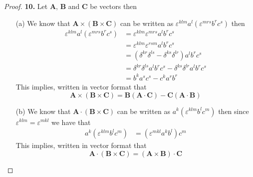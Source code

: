 \documentclass[11pt]{article}
\theoremstyle{definition}
\begin{document}
\cleardoublepage
\begin{proof}{\textbf{10.}}
Let $\bm{A}$, $\bm{B}$ and $\bm{C}$ be vectors then
\begin{itemize}
    \item [(a)] We know that $\bm{A} \times (\bm{B} \times \bm{C})$
    can be written as $\varepsilon^{klm}a^{l}(\varepsilon^{mrs}b^{r}c^{s})$
    then
    \begin{align*}
        \varepsilon^{klm}a^{l}(\varepsilon^{mrs}b^{r}c^{s}) &=
        \varepsilon^{klm}\varepsilon^{mrs}a^{l}b^{r}c^{s}\\
        &= \varepsilon^{klm}\varepsilon^{rsm}a^{l}b^{r}c^{s}\\
        &= (\delta^{kr}\delta^{ls} - \delta^{ks}\delta^{lr})a^{l}b^{r}c^{s}\\
        &= \delta^{kr}\delta^{ls}a^{l}b^{r}c^{s} - \delta^{ks}\delta^{lr}a^{l}b^{r}c^{s}\\
        &= b^{k}a^{s}c^{s} - c^{k}a^{r}b^{r}
    \end{align*}
    This implies, written in vector format that
    $$\bm{A} \times (\bm{B} \times \bm{C})
    = \bm{B}(\bm{A}\cdot \bm{C}) - \bm{C}(\bm{A}\cdot \bm{B})$$
    \item [(b)] We know that $\bm{A} \cdot (\bm{B} \times \bm{C})$
    can be written as $a^k(\varepsilon^{klm}b^{l}c^{m})$
    then since $\varepsilon^{klm} = \varepsilon^{mkl}$ we have that
    \begin{align*}
        a^k(\varepsilon^{klm}b^{l}c^{m}) &=
        (\varepsilon^{mkl}a^kb^{l})c^{m}
    \end{align*}
    This implies, written in vector format that
    $$\bm{A} \cdot (\bm{B} \times \bm{C})
    = (\bm{A} \times \bm{B}) \cdot \bm{C}$$
\end{itemize}
\end{proof}
\cleardoublepage
\end{document}
